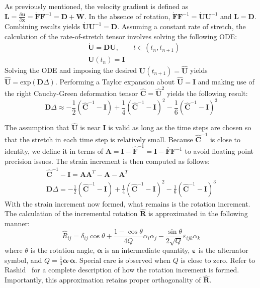 As previously mentioned, the velocity gradient is defined as $\bm{L} = \frac{\partial \bm{u}}{\partial \bm{x}} = \dot{\bm{F}}\bm{F}^{-1} = \bm{D} + \bm{W}$. In the absence of rotation, $\dot{\bm{F}}\bm{F}^{-1} = \dot{\bm{U}}\bm{U}^{-1}$ and $\bm{L} = \bm{D}$. Combining results yields $\dot{\bm{U}}\bm{U}^{-1} = \bm{D}$. Assuming a constant rate of stretch, the calculation of the rate-of-stretch tensor involves solving the following ODE:
\begin{align}
&\dot{{\bm{U}}} = {\bm{D}}{\bm{U}}, \qquad t\in (t_n, t_{n+1}) \\
&{\bm{U}}\left(t_n\right) = \bm{I}
\end{align}
Solving the ODE and imposing the desired ${\bm{U}}(t_{n+1}) = \hat{\bm{U}}$ yields $\hat{\bm{U}} = \text{exp}(\bm{D}\Delta)$. Performing a Taylor expansion about $\hat{\bm{U}} = \bm{I}$ and making use of the right Cauchy-Green deformation tensor $\hat{\bm{C}} = \hat{\bm{U}}^2$ yields the following result: 
\begin{equation}
{\bm{D}}\Delta \approx -\frac{1}{2}(\hat{\bm C}^{-1} - {\bm{I}})+ \frac{1}{4} (\hat{\bm{C}}^{-1} - {\bm{I}})^{2} - \frac{1}{6} (\hat{\bm{C}}^{-1} - {\bm{I}})^{3}
\end{equation}

The assumption that $\hat{\bm{U}}$ is near $\bm{I}$ is valid as long as the time steps are chosen so that the stretch in each time step is relatively small. Because $\hat{\bm{C}}^{-1}$ is close to identity, we define it in terms of $\bm{A} = \bm{I} - \hat{\bm{F}}^{-1} = \bm{I} - \bm{\overline{F}}\bm{F}^{-1}$ to avoid floating point precision issues. The strain increment is then computed as follows:
\begin{gather}
\hat{\bm C}^{-1} - {\bm I} = \bm{A} \bm{A}^T - \bm{A} - \bm{A}^T \\
{\bm D}\Delta = -\frac{1}{2}(\hat{\bm C}^{-1} - {\bm I})+ \frac{1}{4} (\hat{\bm C}^{-1} - {\bm I})^{2} - \frac{1}{6} (\hat{\bm C}^{-1} - {\bm I})^{3}
\end{gather}
With the strain increment now formed, what remains is the rotation increment. The calculation of the incremental rotation $\hat{\bm{R}}$ is approximated in the following manner:
\begin{equation}
\hat{R}_{ij} = \delta_{ij}\cos\theta + \frac{1 - \cos \theta}{4Q}\alpha_i\alpha_j - \frac{\sin\theta}{2\sqrt{Q}}\varepsilon_{ijk}\alpha_{k}
\end{equation}
where $\theta$ is the rotation angle, $\boldsymbol{\alpha}$ is an intermediate quantity, $\boldsymbol{\varepsilon}$ is the alternator symbol, and $Q  =\frac{1}{4}\bm{\alpha} \bm{\cdot} \bm{\alpha}$. Special care is observed when $Q$ is close to zero. Refer to Rashid~\cite{rashid_1993} for a complete description of how the rotation increment is formed. Importantly, this approximation retains proper orthogonality of $\hat{\bm{R}}$.

